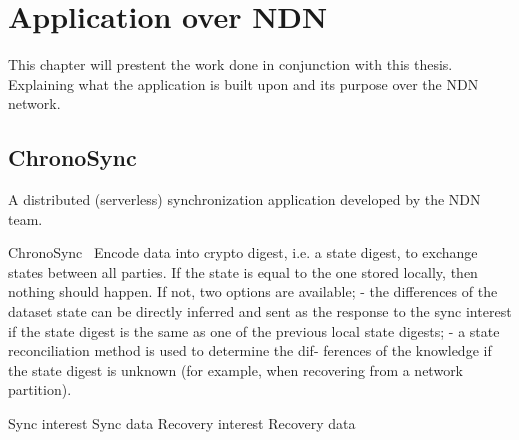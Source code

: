 \chapter{Application over \gls{NDN}}\label{chp3:application}
This chapter will prestent the work done in conjunction with this thesis. 
Explaining what the application is built upon and its purpose over the \gls{NDN} network. 

\section{ChronoSync}
A distributed (serverless) synchronization application developed by the \gls{NDN} team. 

ChronoSync~\cite{DBLP:conf/icnp/ZhuA13}
Encode data into crypto digest, i.e. a state digest, to exchange states between all parties. 
If the state is equal to the one stored locally, then nothing should happen.
If not, two options are available; 
- the differences of the dataset state can be directly inferred
and sent as the response to the sync interest if the state
digest is the same as one of the previous local state
digests;
- a state reconciliation method is used to determine the dif-
ferences of the knowledge if the state digest is unknown
(for example, when recovering from a network partition).

Sync interest
Sync data
Recovery interest
Recovery data



